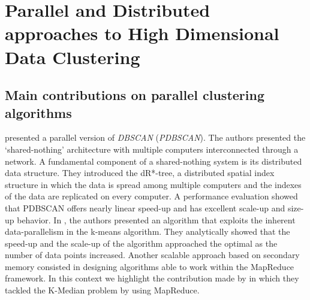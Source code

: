 \documentclass[10pt]{article}
\begin{document}
\section{Parallel and Distributed approaches to High Dimensional Data Clustering}

\subsection{Main contributions on parallel clustering algorithms}

\citep{XJK99} presented a parallel version of \textit{DBSCAN} (\textit{PDBSCAN}). The authors presented the ‘shared-nothing’ architecture with multiple computers interconnected through a network. A fundamental component of a shared-nothing system is its distributed data structure. They introduced the dR*-tree, a distributed spatial index structure in which the data is spread among multiple computers and the indexes of the data are replicated on every computer. A performance evaluation
showed that PDBSCAN offers nearly linear speed-up and has excellent scale-up and size-up behavior. 
In \citep{DM99}, the authors presented an algorithm that exploits the inherent data-parallelism in the k-means algorithm. They analytically showed that the speed-up and the scale-up of the algorithm approached the optimal as the number of data points increased.
Another scalable approach based on secondary memory consisted in designing algorithms able to work  within the MapReduce framework. %
In this context we highlight the contribution made %
by \citep{EIM11} in which they tackled the K-Median problem by using MapReduce.
\end{document}
